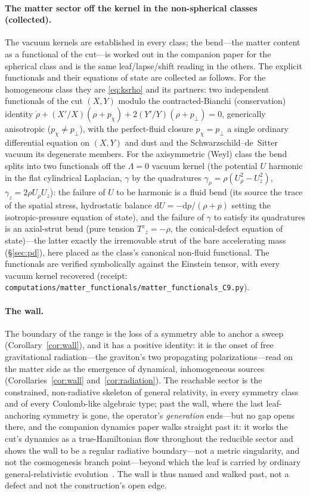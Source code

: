 \documentclass[11pt,a4paper]{article}
\theoremstyle{definition}
\newcommand{\dd}{\mathrm{d}}
\begin{document}
\paragraph{The matter sector off the kernel in the non-spherical classes (collected).} The vacuum kernels are established in every class; the bend---the matter content as a functional of the cut---is worked out in the companion paper for the spherical class and is the same leaf/lapse/shift reading in the others. The explicit functionals and their equations of state are collected as follows. For the homogeneous class they are \eqref{eq:ksrho} and its partners: two independent functionals of the cut $(X,Y)$ modulo the contracted-Bianchi (conservation) identity $\dot\rho+(X'/X)(\rho+p_{\chi})+2(Y'/Y)(\rho+p_{\perp})=0$, generically anisotropic ($p_{\chi}\neq p_{\perp}$), with the perfect-fluid closure $p_{\chi}=p_{\perp}$ a single ordinary differential equation on $(X,Y)$ and dust and the Schwarzschild--de~Sitter vacuum its degenerate members. For the axisymmetric (Weyl) class the bend splits into two functionals off the $\Lambda=0$ vacuum kernel (the potential $U$ harmonic in the flat cylindrical Laplacian, $\gamma$ by the quadratures $\gamma_{\rho}=\rho(U_{\rho}^{2}-U_{z}^{2})$, $\gamma_{z}=2\rho U_{\rho}U_{z}$): the failure of $U$ to be harmonic is a fluid bend (its source the trace of the spatial stress, hydrostatic balance $\dd U=-\dd p/(\rho+p)$ setting the isotropic-pressure equation of state), and the failure of $\gamma$ to satisfy its quadratures is an axial-strut bend (pure tension $T^{z}{}_{z}=-\rho$, the conical-defect equation of state)---the latter exactly the irremovable strut of the bare accelerating mass (\S\ref{sec:pd}), here placed as the class's canonical non-fluid functional. The functionals are verified symbolically against the Einstein tensor, with every vacuum kernel recovered (receipt: \texttt{computations/matter\_functionals/matter\_functionals\_C9.py}).

\paragraph{The wall.} The boundary of the range is the loss of a symmetry able to anchor a sweep (Corollary~\ref{cor:wall}), and it has a positive identity: it is the onset of free gravitational radiation---the graviton's two propagating polarizations---read on the matter side as the emergence of dynamical, inhomogeneous sources (Corollaries~\ref{cor:wall} and~\ref{cor:radiation}). The reachable sector is the constrained, non-radiative skeleton of general relativity, in every symmetry class and of every Coulomb-like algebraic type; past the wall, where the last leaf-anchoring symmetry is gone, the operator's \emph{generation} ends---but no gap opens there, and the companion dynamics paper walks straight past it: it works the cut's dynamics as a true-Hamiltonian flow throughout the reducible sector and shows the wall to be a regular radiative boundary---not a metric singularity, and not the cosmogenesis branch point---beyond which the leaf is carried by ordinary general-relativistic evolution~\cite{JanzenDynamics}. The wall is thus named and walked past, not a defect and not the construction's open edge. 
\end{document}

